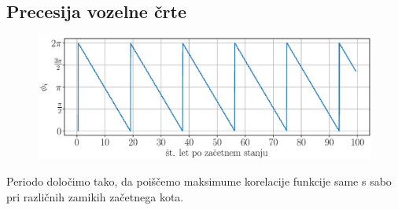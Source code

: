 \documentclass[a4paper,12pt]{article}
\begin{document}
\newpage

\subsection{Precesija vozelne črte}
\begin{figure}[h!]
    \centering
    \includegraphics[scale=0.53]{slikep/nodal-angle.eps}
    \label{fig:nodal-angle}
\end{figure}

\noindent
Periodo določimo tako, da poiščemo maksimume korelacije funkcije same s sabo
pri različnih zamikih začetnega kota.
\end{document}
